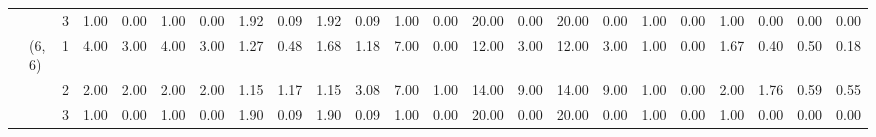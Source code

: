 \begin{tabular}{lllrrrrrrrrrrrrrrrrrrrr}
       &        & 3 &  1.00 &  0.00 &  1.00 &  0.00 & 1.92 & 0.09 & 1.92 & 0.09 & 1.00 & 0.00 & 20.00 &  0.00 & 20.00 &  0.00 & 1.00 & 0.00 &    1.00 & 0.00 &    0.00 & 0.00 \\
       & (6, 6) & 1 &  4.00 &  3.00 &  4.00 &  3.00 & 1.27 & 0.48 & 1.68 & 1.18 & 7.00 & 0.00 & 12.00 &  3.00 & 12.00 &  3.00 & 1.00 & 0.00 &    1.67 & 0.40 &    0.50 & 0.18 \\
       &        & 2 &  2.00 &  2.00 &  2.00 &  2.00 & 1.15 & 1.17 & 1.15 & 3.08 & 7.00 & 1.00 & 14.00 &  9.00 & 14.00 &  9.00 & 1.00 & 0.00 &    2.00 & 1.76 &    0.59 & 0.55 \\
       &        & 3 &  1.00 &  0.00 &  1.00 &  0.00 & 1.90 & 0.09 & 1.90 & 0.09 & 1.00 & 0.00 & 20.00 &  0.00 & 20.00 &  0.00 & 1.00 & 0.00 &    1.00 & 0.00 &    0.00 & 0.00 \\
\bottomrule
\end{tabular}
